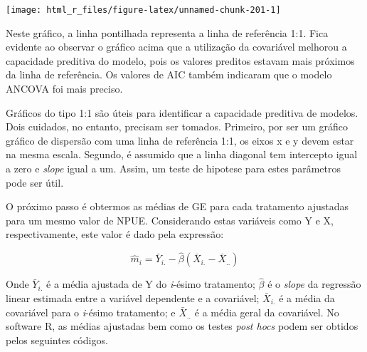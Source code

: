\documentclass[
]{book}
\begin{document}
\begin{center}\texttt{[image: html\_r\_files/figure-latex/unnamed-chunk-201-1]} \end{center}

Neste gráfico, a linha pontilhada representa a linha de referência 1:1. Fica evidente ao observar o gráfico acima que a utilização da covariável melhorou a capacidade preditiva do modelo, pois os valores preditos estavam mais próximos da linha de referência. Os valores de AIC também indicaram que o modelo ANCOVA foi mais preciso.

\begin{dica}
Gráficos do tipo 1:1 são úteis para identificar a capacidade preditiva de modelos. Dois cuidados, no entanto, precisam ser tomados. Primeiro, por ser um gráfico gráfico de dispersão com uma linha de referência 1:1, os eixos x e y devem estar na mesma escala. Segundo, é assumido que a linha diagonal tem intercepto igual a zero e \emph{slope} igual a um. Assim, um teste de hipotese para estes parâmetros pode ser útil.
\end{dica}

O próximo passo é obtermos as médias de GE para cada tratamento ajustadas para um mesmo valor de NPUE. Considerando estas variáveis como Y e X, respectivamente, este valor é dado pela expressão:

\[
\hat m_i = \bar{Y}_{i.}- \hat \beta(\bar{X}_{i.}- \bar X_{..})
\]

Onde \(\bar{Y}_{i.}\) é a média ajustada de Y do \emph{i}-ésimo tratamento; \(\hat \beta\) é o \emph{slope} da regressão linear estimada entre a variável dependente e a covariável; \(\bar{X}_{i.}\) é a média da covariável para o \emph{i}-ésimo tratamento; e \(\bar{X}_{..}\) é a média geral da covariável. No software R, as médias ajustadas bem como os testes \emph{post hocs} podem ser obtidos pelos seguintes códigos.

\end{document}
